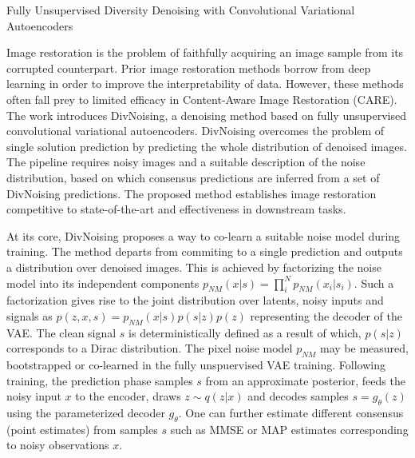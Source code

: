 \documentclass[11pt,letterpaper]{article}
\begin{document}
\begin{center}
  \large{Fully Unsupervised Diversity Denoising with Convolutional Variational Autoencoders}
\end{center}


Image restoration is the problem of faithfully acquiring an image sample from its corrupted counterpart. Prior image restoration methods borrow from deep learning in order to improve the interpretability of data. However, these methods often fall prey to limited efficacy in Content-Aware Image Restoration (CARE). The work introduces DivNoising, a denoising method based on fully unsupervised convolutional variational autoencoders. DivNoising overcomes the problem of single solution prediction by predicting the whole distribution of denoised images. The pipeline requires noisy images and a suitable description of the noise distribution, based on which consensus predictions are inferred from a set of DivNoising predictions. The proposed method establishes image restoration competitive to state-of-the-art and effectiveness in downstream tasks. 

At its core, DivNoising proposes a way to co-learn a suitable noise model during training. The method departs from commiting to a single prediction and outputs a distribution over denoised images. This is achieved by factorizing the noise model into its independent components $p_{NM}(x|s) = \prod_{i}^{N}p_{NM}(x_{i}|s_{i})$. Such a factorization gives rise to the joint distribution over latents, noisy inputs and signals as $p(z,x,s) = p_{NM}(x|s)p(s|z)p(z)$ representing the decoder of the VAE. The clean signal $s$ is deterministically defined as a result of which, $p(s|z)$ corresponds to a Dirac distribution. The pixel noise model $p_{NM}$ may be measured, bootstrapped or co-learned in the fully unspuervised VAE training. Following training, the prediction phase samples $s$ from an approximate posterior, feeds the noisy input $x$ to the encoder, draws $z \sim q(z|x)$ and decodes samples $s = g_{\theta}(z)$ using the parameterized decoder $g_{\theta}$. One can further estimate different consensus (point estimates) from samples $s$ such as MMSE or MAP estimates corresponding to noisy observations $x$.
\end{document}

